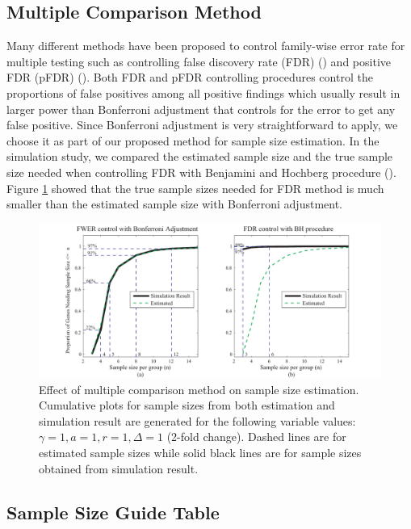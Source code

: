 \documentclass{bioinfo}
\begin{document}
\subsection{Multiple Comparison Method}

Many different methods have been proposed to control family-wise
error rate for multiple testing such as controlling false
discovery rate (FDR) (\citealp{Benjamini95}) and positive FDR
(pFDR) (\citealp{Storey02}). Both FDR and pFDR controlling
procedures control the proportions of false positives among all
positive findings which usually result in larger power than
Bonferroni adjustment that controls for the error to get any false
positive. Since Bonferroni adjustment is very straightforward to
apply, we choose it as part of our proposed method for sample size
estimation. In the simulation study, we compared the estimated
sample size and the true sample size needed when controlling FDR
with Benjamini and Hochberg procedure (\citealp{Benjamini95}).
Figure \ref{fig:ResMtd} showed that the true sample sizes needed
for FDR method is much smaller than the estimated sample size with
Bonferroni adjustment.

\begin{figure}[h]
  \centerline{\includegraphics*[width=3.5 in]{ResMtd.pdf}}
  \caption[Effect of multiple comparison method on sample size estimation]
  {Effect of multiple comparison method on sample size estimation.
    Cumulative plots for sample sizes from both estimation and
    simulation result are generated for the following variable values: $\gamma = 1, a = 1, r = 1,
    \Delta = 1$ (2-fold change). Dashed lines are for estimated sample sizes
    while solid black lines are for sample sizes obtained from simulation result.}
  \label{fig:ResMtd}
\end{figure}


\subsection{Sample Size Guide Table}
\end{document}
